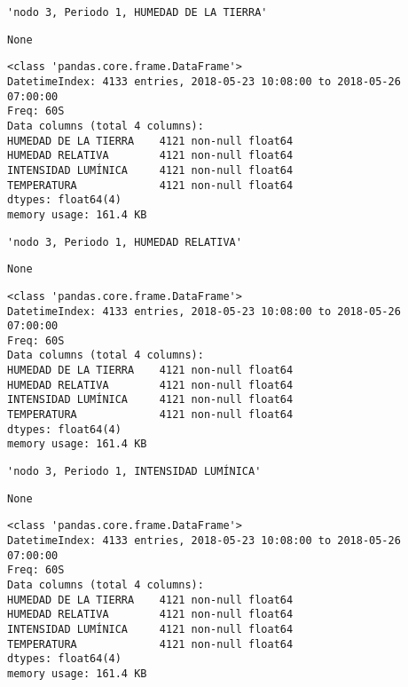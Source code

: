 \documentclass[11pt]{article}
\begin{document}
    
    \begin{verbatim}
'nodo 3, Periodo 1, HUMEDAD DE LA TIERRA'
    \end{verbatim}

    
    
    \begin{verbatim}
None
    \end{verbatim}

    
    \begin{Verbatim}[commandchars=\\\{\}]
<class 'pandas.core.frame.DataFrame'>
DatetimeIndex: 4133 entries, 2018-05-23 10:08:00 to 2018-05-26 07:00:00
Freq: 60S
Data columns (total 4 columns):
HUMEDAD DE LA TIERRA    4121 non-null float64
HUMEDAD RELATIVA        4121 non-null float64
INTENSIDAD LUMÍNICA     4121 non-null float64
TEMPERATURA             4121 non-null float64
dtypes: float64(4)
memory usage: 161.4 KB

    \end{Verbatim}

    
    \begin{verbatim}
'nodo 3, Periodo 1, HUMEDAD RELATIVA'
    \end{verbatim}

    
    
    \begin{verbatim}
None
    \end{verbatim}

    
    \begin{Verbatim}[commandchars=\\\{\}]
<class 'pandas.core.frame.DataFrame'>
DatetimeIndex: 4133 entries, 2018-05-23 10:08:00 to 2018-05-26 07:00:00
Freq: 60S
Data columns (total 4 columns):
HUMEDAD DE LA TIERRA    4121 non-null float64
HUMEDAD RELATIVA        4121 non-null float64
INTENSIDAD LUMÍNICA     4121 non-null float64
TEMPERATURA             4121 non-null float64
dtypes: float64(4)
memory usage: 161.4 KB

    \end{Verbatim}

    
    \begin{verbatim}
'nodo 3, Periodo 1, INTENSIDAD LUMÍNICA'
    \end{verbatim}

    
    
    \begin{verbatim}
None
    \end{verbatim}

    
    \begin{Verbatim}[commandchars=\\\{\}]
<class 'pandas.core.frame.DataFrame'>
DatetimeIndex: 4133 entries, 2018-05-23 10:08:00 to 2018-05-26 07:00:00
Freq: 60S
Data columns (total 4 columns):
HUMEDAD DE LA TIERRA    4121 non-null float64
HUMEDAD RELATIVA        4121 non-null float64
INTENSIDAD LUMÍNICA     4121 non-null float64
TEMPERATURA             4121 non-null float64
dtypes: float64(4)
memory usage: 161.4 KB

    \end{Verbatim}
\end{document}
